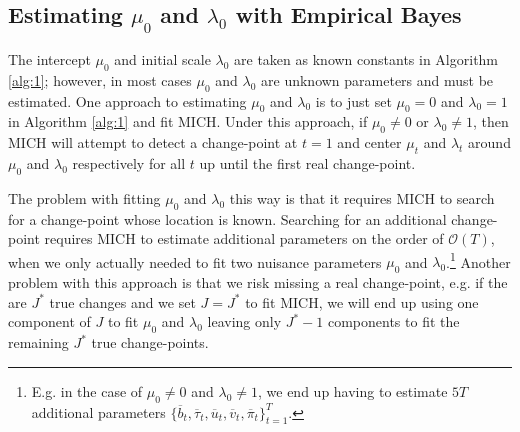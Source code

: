\subsection{Estimating \texorpdfstring{$\mu_0$}{mu0} and \texorpdfstring{$\lambda_0$}{lambda0} with Empirical Bayes}
\label{app:empirical-bayes}

The intercept $\mu_0$ and initial scale $\lambda_0$ are taken as known constants in Algorithm \ref{alg:1}; however, in most cases $\mu_0$ and $\lambda_0$ are unknown parameters and must be estimated. One approach to estimating $\mu_0$ and $\lambda_0$ is to just set $\mu_0 = 0$ and $\lambda_0 = 1$ in Algorithm \ref{alg:1} and fit MICH. Under this approach, if $\mu_0 \neq 0$ or $\lambda_0 \neq 1$, then MICH will attempt to detect a change-point at $t=1$ and center $\mu_{t}$ and $\lambda_t$ around $\mu_0$ and $\lambda_0$ respectively for all $t$ up until the first real change-point.

The problem with fitting $\mu_0$ and $\lambda_0$ this way is that it requires MICH to search for a change-point whose location is known. Searching for an additional change-point requires MICH to estimate additional parameters on the order of $\mathcal{O}(T)$, when we only actually needed to fit two nuisance parameters $\mu_0$ and $\lambda_0$.\footnote{E.g. in the case of $\mu_0 \neq 0$ and $\lambda_0 \neq 1$, we end up having to estimate $5T$ additional parameters $\{\overline{b}_t, \overline{\tau}_t, \overline{u}_t, \overline{v}_t, \overline{\pi}_t\}_{t=1}^T$.} Another problem with this approach is that we risk missing a real change-point, e.g. if the are $J^*$ true changes and we set $J=J^*$ to fit MICH, we will end up using one component of $J$ to fit $\mu_0$ and $\lambda_0$ leaving only $J^*-1$ components to fit the remaining $J^*$ true change-points. 

